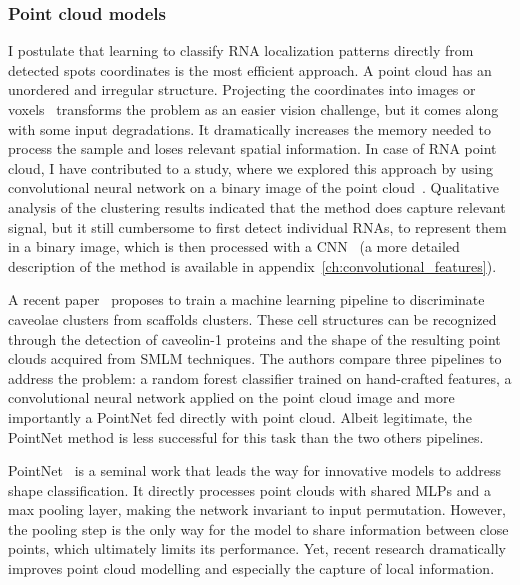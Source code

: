 \subsubsection{Point cloud models}

I postulate that learning to classify RNA localization patterns directly from detected spots coordinates is the most efficient approach.
A point cloud has an unordered and irregular structure.
Projecting the coordinates into images or voxels~\cite{Maturana_2015} transforms the problem as an easier vision challenge, but it comes along with some input degradations.
It dramatically increases the memory needed to process the sample and loses relevant spatial information.
In case of \ac{RNA} point cloud, I have contributed to a study, where we explored this approach by using convolutional neural network on a binary image of the point cloud~\cite{dubois_deep_2019}. Qualitative analysis of the clustering results indicated that the method does capture relevant signal, but it still cumbersome to first detect individual \ac{RNA}s, to represent them in a binary image, which is then processed with a CNN~\cite{dubois_deep_2019} (a more detailed description of the method is available in appendix~\ref{ch:convolutional_features}). 

A recent paper~\cite{khater_caveolae_2019} proposes to train a machine learning pipeline to discriminate caveolae clusters from scaffolds clusters.
These cell structures can be recognized through the detection of caveolin-1 proteins and the shape of the resulting point clouds acquired from \ac{SMLM} techniques.
The authors compare three pipelines to address the problem: a random forest classifier trained on hand-crafted features, a convolutional neural network applied on the point cloud image and more importantly a PointNet fed directly with point cloud.
Albeit legitimate, the PointNet method is less successful for this task than the two others pipelines.

PointNet~\cite{Qi_2017_CVPR} is a seminal work that leads the way for innovative models to address shape classification.
It directly processes point clouds with shared MLPs and a max pooling layer, making the network invariant to input permutation.
However, the pooling step is the only way for the model to share information between close points, which ultimately limits its performance.
Yet, recent research dramatically improves point cloud modelling and especially the capture of local information.

